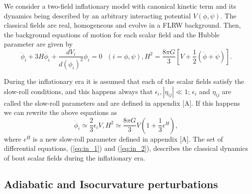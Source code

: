 \documentclass[amssymb,twocolumn,prd,nofootinbib,showpacs]{revtex4-1}
\begin{document}
We consider a two-field inflationary model with canonical kinetic term and  its dynamics being described by an arbitrary 
interacting potential $V(\phi,\psi)$. The classical fields are real, homogeneous and evolve in a FLRW background. 
Then, the background equations of motion for each scalar field and the Hubble parameter are given by
%
\begin{subequations}
\begin{equation}\label{KGEq}
\ddot{\phi}_i+3H\dot{\phi_i}+\frac{dV_i}{d(\phi_i)^2}\phi_i=0 \ \ \ (i=\phi,\psi),
\end{equation}
\begin{equation}
H^2=\frac{8\pi G}{3}\left[V+\frac{1}{2}\left(\dot{\phi}+\dot\psi\right)\right].
\end{equation}
\end{subequations}

During the inflationary era it is assumed that each of the scalar fields satisfy the slow-roll conditions, and 
this happens always that $\epsilon_i,|\eta_{ij}|\ll 1$; $\epsilon_i$ and $\eta_{ij}$ are called the slow-roll parameters 
and are defined in appendix [A]. If this happens we can rewrite the above equations as
\begin{subequations}
\begin{equation}\label{eq:in_1}
\dot{\phi}_i\simeq \frac{2}{3}\epsilon_i V,
\end{equation}
\begin{equation}\label{eq:in_2}
H^2\simeq \frac{8\pi G}{3}V\left(1+\frac{1}{3}\epsilon^H\right),
\end{equation}
\end{subequations}
where $\epsilon^H$ is a new slow-roll parameter defined in appendix [A]. 
The set of differential equations, (\ref{eq:in_1}) and (\ref{eq:in_2}),  
describes the classical dynamics of bout scalar fields during the inflationary era.

\subsection{Adiabatic and Isocurvature perturbations}
\end{document}
